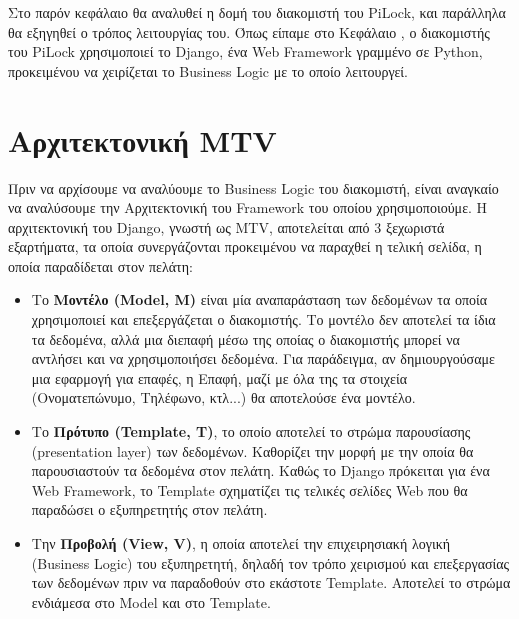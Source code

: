 Στο παρόν κεφάλαιο θα αναλυθεί η δομή του διακομιστή του PiLock, και παράλληλα θα εξηγηθεί ο τρόπος λειτουργίας του. Όπως είπαμε στο Κεφάλαιο , ο διακομιστής του PiLock χρησιμοποιεί το Django, ένα Web Framework γραμμένο σε Python, προκειμένου να χειρίζεται το Business Logic με το οποίο λειτουργεί.

\section{Αρχιτεκτονική MTV}
	Πριν να αρχίσουμε να αναλύουμε το Business Logic του διακομιστή, είναι αναγκαίο να αναλύσουμε την Αρχιτεκτονική του Framework του οποίου χρησιμοποιούμε. Η αρχιτεκτονική του Django, γνωστή ως MTV, αποτελείται από 3 ξεχωριστά εξαρτήματα, τα οποία συνεργάζονται προκειμένου να παραχθεί η τελική σελίδα, η οποία παραδίδεται στον πελάτη:

	\begin{itemize}
		\item Το \textbf{Μοντέλο (Model, M)} είναι μία αναπαράσταση των δεδομένων τα οποία χρησιμοποιεί και επεξεργάζεται ο διακομιστής. Το μοντέλο δεν αποτελεί τα ίδια τα δεδομένα, αλλά μια διεπαφή μέσω της οποίας ο διακομιστής μπορεί να αντλήσει και να χρησιμοποιήσει δεδομένα. Για παράδειγμα, αν δημιουργούσαμε μια εφαρμογή για επαφές, η Επαφή, μαζί με όλα της τα στοιχεία (Ονοματεπώνυμο, Τηλέφωνο, κτλ...) θα αποτελούσε ένα μοντέλο. 
		\item Το \textbf{Πρότυπο (Template, T)}, το οποίο αποτελεί το στρώμα παρουσίασης (presentation layer) των δεδομένων. Καθορίζει την μορφή με την οποία θα παρουσιαστούν τα δεδομένα στον πελάτη. Καθώς το Django πρόκειται για ένα Web Framework, το Template σχηματίζει τις τελικές σελίδες Web που θα παραδώσει ο εξυπηρετητής στον πελάτη.
		\item Την \textbf{Προβολή (View, V)}, η οποία αποτελεί την επιχειρησιακή λογική (Business Logic) του εξυπηρετητή, δηλαδή τον τρόπο χειρισμού και επεξεργασίας των δεδομένων πριν να παραδοθούν στο εκάστοτε Template. Αποτελεί το στρώμα ενδιάμεσα στο Model και στο Template.
	\end{itemize}

